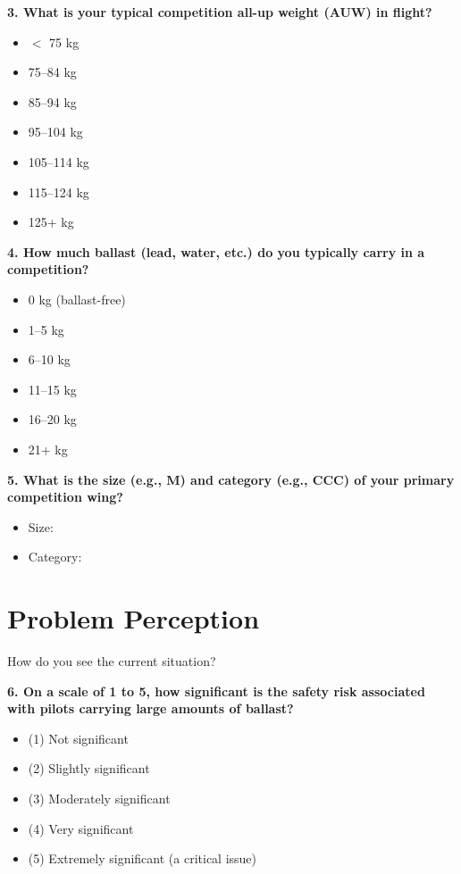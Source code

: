 \documentclass[11pt,a4paper]{article}
\begin{document}
\textbf{3. What is your typical competition all-up weight (AUW) in flight?}
\begin{itemize}[label=$\square$]
    \item $<$ 75 kg
    \item 75--84 kg
    \item 85--94 kg
    \item 95--104 kg
    \item 105--114 kg
    \item 115--124 kg
    \item 125+ kg
\end{itemize}

\textbf{4. How much ballast (lead, water, etc.) do you typically carry in a competition?}
\begin{itemize}[label=$\square$]
    \item 0 kg (ballast-free)
    \item 1--5 kg
    \item 6--10 kg
    \item 11--15 kg
    \item 16--20 kg
    \item 21+ kg
\end{itemize}

\textbf{5. What is the size (e.g., M) and category (e.g., CCC) of your primary competition wing?}
\begin{itemize}[label={}]
    \item Size: \underline{\hspace{3cm}}
    \item Category: \underline{\hspace{3cm}}
\end{itemize}

\section{Problem Perception}

How do you see the current situation?

\textbf{6. On a scale of 1 to 5, how significant is the safety risk associated with pilots carrying large amounts of ballast?}
\begin{itemize}[label={}]
    \item (1) Not significant
    \item (2) Slightly significant
    \item (3) Moderately significant
    \item (4) Very significant
    \item (5) Extremely significant (a critical issue)
\end{itemize}
\end{document}
